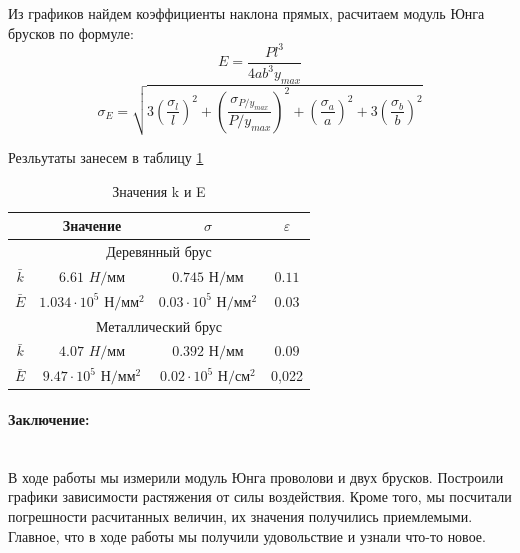 \documentclass[a4paper, 12pt]{article}
\newcommand{\parag}[1]{\paragraph*{#1:}}
\begin{document}
Из графиков найдем коэффициенты наклона прямых, расчитаем модуль Юнга брусков по формуле:
\[
    E = \dfrac{Pl^3}{4ab^3y_{max}}
\]
\[
    \sigma_E = \sqrt{3 \left( \dfrac{\sigma_{l}}{l} \right)^2 + \left( \dfrac{\sigma_{P/y_{max}}}{P/y_{max}} \right)^2 + \left( \dfrac{\sigma_{a}}{a} \right)^2 + 3 \left( \dfrac{\sigma_{b}}{b} \right)^2}
\]

Резльутаты занесем в таблицу \ref{tabl:res2}


\begin{table}[H]
    \centering
    \begin{tabular}{|c|c|c|c|}
        \hline
         & Значение&$\sigma$&$\varepsilon$\\
        \hline
        \multicolumn{4}{|c|}{Деревянный брус} \\
        \hline
        $\bar{k}$ & $6.61$ $H/мм$ & $0.745$ $Н/мм$ & $0.11$ \\
        \hline       
        $\bar{E}$ & $1.034 \cdot 10^5$ $Н/мм^2$ & $ 0.03 \cdot 10^5$ $Н/мм^2$ & $0.03$ \\\hline

        \multicolumn{4}{|c|}{Металлический брус} \\
        \hline
        $\bar{k}$ & $4.07$ $H/мм$ & $0.392$ $Н/мм$ & $0.09$ \\
        \hline       
        $\bar{E}$ & $9.47 \cdot 10^{5}$ $Н/мм^2$ & $ 0.02 \cdot  10^{5}$ $Н/см^2$ & 0,022 \\ \hline
    \end{tabular}
    \caption{Значения k и E}
    \label{tabl:res2}
\end{table}


\parag {Заключение} ~\\
В ходе работы мы измерили модуль Юнга проволови и двух брусков. Построили графики зависимости растяжения от силы воздействия. Кроме того, мы посчитали погрешности расчитанных величин, их значения получились приемлемыми. Главное, что в ходе работы мы получили удовольствие и узнали что-то новое.
\end{document}

